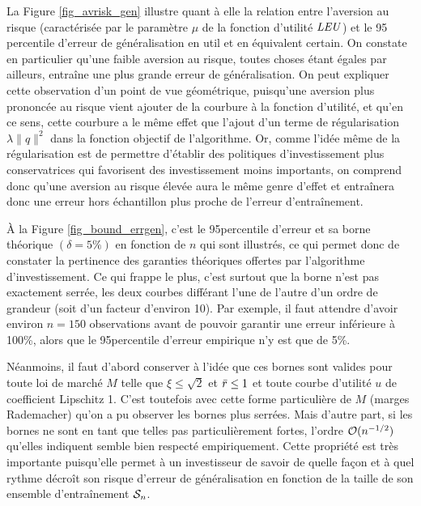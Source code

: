 La Figure \ref{fig_avrisk_gen} illustre quant à elle la relation entre l'aversion au
risque (caractérisée par le paramètre $\mu$ de la fonction d'utilité $\LEU$) et le 95\ieme
percentile d'erreur de généralisation en util et en équivalent certain. On constate en
particulier qu'une faible aversion au risque, toutes choses étant égales par ailleurs,
entraîne une plus grande erreur de généralisation. On peut expliquer cette observation
d'un point de vue géométrique, puisqu'une aversion plus prononcée au risque vient ajouter
de la courbure à la fonction d'utilité, et qu'en ce sens, cette courbure a le même effet
que l'ajout d'un terme de régularisation $\lambda\|q\|^2$ dans la fonction objectif de
l'algorithme. Or, comme l'idée même de la régularisation est de permettre d'établir des
politiques d'investissement plus conservatrices qui favorisent des investissement moins
importants, on comprend donc qu'une aversion au risque élevée aura le même genre d'effet
et entraînera donc une erreur hors échantillon plus proche de l'erreur d'entraînement.

À la Figure \ref{fig_bound_errgen}, c'est le 95\ieme percentile d'erreur et sa borne
théorique $(\delta = 5\%)$ en fonction de $n$ qui sont illustrés, ce qui permet donc de
constater la pertinence des garanties théoriques offertes par l'algorithme
d'investissement. Ce qui frappe le plus, c'est surtout que la borne n'est pas exactement
serrée, les deux courbes différant l'une de l'autre d'un ordre de grandeur (soit d'un
facteur d'environ 10). Par exemple, il faut attendre d'avoir environ $n=150$ observations
avant de pouvoir garantir une erreur inférieure à 100\%, alors que le 95\ieme percentile
d'erreur empirique n'y est que de 5\%.

Néanmoins, il faut d'abord conserver à l'idée que ces bornes sont valides pour toute loi
de marché $M$ telle que $\xi\leq\sqrt{2}$ et $\rmax\leq 1$ et toute courbe d'utilité $u$ de
coefficient Lipschitz 1. C'est toutefois avec cette forme particulière de $M$ (marges
Rademacher) qu'on a pu observer les bornes plus serrées. Mais d'autre part, si les bornes
ne sont en tant que telles pas particulièrement fortes, l'ordre $\bigO(n^{-1/2})$ qu'elles
indiquent semble bien respecté empiriquement. Cette propriété est très importante
puisqu'elle permet à un investisseur de savoir de quelle façon et à quel rythme décroît
son risque d'erreur de généralisation en fonction de la taille de son ensemble
d'entraînement $\S_n$. 

